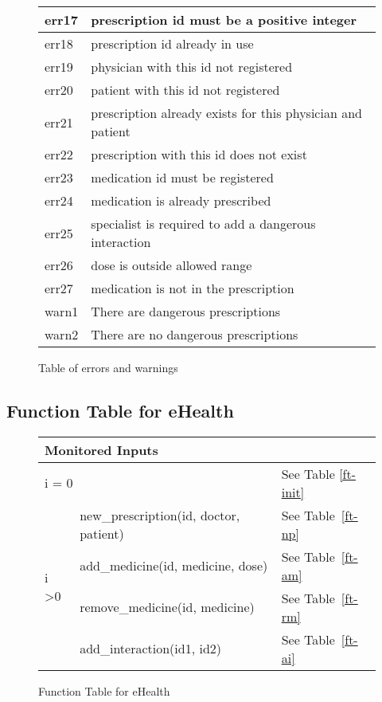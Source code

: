 \begin{figure}[]
\begin{center}
\begin{tabular}{|l|l|}
err17 & prescription id must be a positive integer                 \\ \hline
err18 & prescription id already in use                             \\ \hline
err19 & physician with this id not registered                      \\ \hline
err20 & patient with this id not registered                        \\ \hline
err21 & prescription already exists for this physician and patient \\ \hline
err22 & prescription with this id does not exist                   \\ \hline
err23 & medication id must be registered                           \\ \hline
err24 & medication is already prescribed                           \\ \hline
err25 & specialist is required to add a dangerous interaction      \\ \hline
err26 & dose is outside allowed range                              \\ \hline
err27 & medication is not in the prescription                      \\ \hline
warn1 & There are dangerous prescriptions                          \\ \hline
warn2 & There are no dangerous prescriptions                       \\ \hline
\end{tabular}
\caption{Table of errors and warnings}
\label{err-table}
\end{center}
\end{figure}

\newpage


\subsection{Function Table for eHealth}
\begin{figure}[h]
\begin{center}
\begin{tabular}{|l|l|l|}
\hline
\multicolumn{2}{|l|}{Monitored Inputs}                &             \\ \hline
\multicolumn{2}{|l|}{i = 0}                           & See Table \ref{ft-init} \\ \hline
\multirow{4}{*}{i \textgreater 0} & new\_prescription(id, doctor, patient) & See Table~\ref{ft-np} \\ \cline{2-3} 
                                  & add\_medicine(id, medicine, dose)     & See Table~\ref{ft-am} \\ \cline{2-3} 
                                  & remove\_medicine(id, medicine) & See Table~\ref{ft-rm} \\ \cline{2-3} 
                                  & add\_interaction(id1, id2)  & See Table~\ref{ft-ai} \\ \hline
\end{tabular}
\caption{Function Table for eHealth}
\label{ft-ehealth}
\end{center}
\end{figure}

